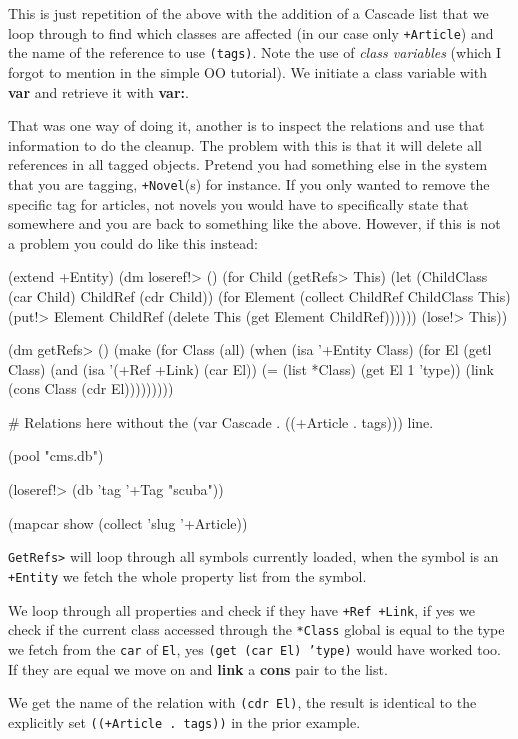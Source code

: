 This is just repetition of the above with the addition of a Cascade
list that we loop through to find which classes are affected (in our
case only \texttt{+Article}) and the name of the reference to use
\texttt{(tags)}. Note the use of \emph{class variables} (which I
forgot to mention in the simple OO tutorial). We initiate a class
variable with \textbf{var} and retrieve it with \textbf{var:}.

That was one way of doing it, another is to inspect the relations and
use that information to do the cleanup. The problem with this is that it
will delete all references in all tagged objects. Pretend you had
something else in the system that you are tagging, \texttt{+Novel}(s) for
instance. If you only wanted to remove the specific tag for articles,
not novels you would have to specifically state that somewhere and you
are back to something like the above. However, if this is not a problem
you could do like this instead:

\begin{wideverbatim}
(extend +Entity)
(dm loseref!> ()
    (for Child (getRefs> This) 
         (let (ChildClass (car Child) ChildRef (cdr Child)) 
           (for Element (collect ChildRef ChildClass This)
                (put!> Element ChildRef (delete This (get Element ChildRef))))))
    (lose!> This))

(dm getRefs> ()
    (make 
     (for Class (all)
          (when (isa '+Entity Class) 
            (for El (getl Class) 
                 (and 
                  (isa '(+Ref +Link) (car El))
                  (= (list *Class) (get El 1 'type))
                  (link (cons Class (cdr El)))))))))

\end{wideverbatim}

\begin{wideverbatim}


# Relations here without the (var Cascade . ((+Article . tags))) line.

(pool "cms.db")

(loseref!> (db 'tag '+Tag "scuba"))

(mapcar show (collect 'slug '+Article))
\end{wideverbatim}

\texttt{GetRefs>} will loop through all symbols currently loaded, when
the symbol is an \texttt{+Entity} we fetch the whole property list
from the symbol.

We loop through all properties and check if they have \texttt{+Ref
  +Link}, if yes we check if the current class accessed through the
\texttt{*Class} global is equal to the type we fetch from the
\texttt{car} of \texttt{El}, yes \texttt{(get (car El) 'type)} would
have worked too. If they are equal we move on and \textbf{link} a
\textbf{cons} pair to the list.

We get the name of the relation with \texttt{(cdr El)}, the result is
identical to the explicitly set \texttt{((+Article . tags))} in the
prior example.

